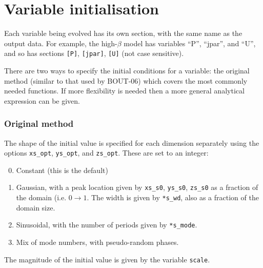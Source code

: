 \documentclass[12pt]{article}
\newcommand{\code}[1]{\texttt{#1}}
\def\Rarrow{\rightarrow}
\begin{document}
\section{Variable initialisation}
%
%
Each variable being evolved has its own section, with the same name as the
output data. For example, the high-$\beta$ model has variables ``P'', ``jpar'',
and ``U'', and so has sections \code{[P]}, \code{[jpar]}, \code{[U]} (not case
sensitive).

There are two ways to specify the initial conditions for a variable: the
original method (similar to that used by BOUT-06) which covers the most
commonly needed functions. If more flexibility is needed then a more general
analytical expression can be given.


\subsubsection{Original method}
%
The shape of the initial value is specified for each dimension separately using
the options \code{xs\_opt}, \code{ys\_opt}, and \code{zs\_opt}. These are set
to an integer:
%
\begin{enumerate}
\setcounter{enumi}{-1}
\item Constant (this is the default)
\item Gaussian, with a peak location given by \code{xs\_s0}, \code{ys\_s0},
    \code{zs\_s0} as a fraction of the domain (i.e. $0 \Rarrow 1$.  The
    width is given by \code{*s\_wd}, also as a fraction of the domain size.
\item Sinusoidal, with the number of periods given by \code{*s\_mode}.
\item Mix of mode numbers, with pseudo-random phases.
\end{enumerate}
%
The magnitude of the initial value is given by the variable \code{scale}.
\end{document}
